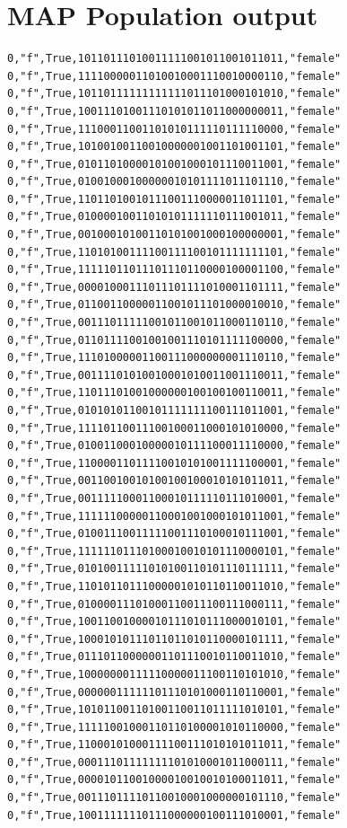 \documentclass[authoryearcitations]{UoYCSproject}
\begin{document}
\section{MAP Population output}
\begin{framed}
\begin{verbatim}
0,"f",True,10110111010011111001011001011011,"female"
0,"f",True,11110000011010010001110010000110,"female"
0,"f",True,10110111111111111011101000101010,"female"
0,"f",True,10011101001110101011011000000011,"female"
0,"f",True,11100011001101010111110111110000,"female"
0,"f",True,10100100110010000001001101001101,"female"
0,"f",True,01011010000101001000101110011001,"female"
0,"f",True,01001000100000010101111011101110,"female"
0,"f",True,11011010010111001110000011011101,"female"
0,"f",True,01000010011010101111110111001011,"female"
0,"f",True,00100010100110101001000100000001,"female"
0,"f",True,11010100111100111100101111111101,"female"
0,"f",True,11111011011101110110000100001100,"female"
0,"f",True,00001000111011101111010001101111,"female"
0,"f",True,01100110000011001011101000010010,"female"
0,"f",True,00111011111001011001011000110110,"female"
0,"f",True,01101111001001001110101111100000,"female"
0,"f",True,11101000001100111000000001110110,"female"
0,"f",True,00111101010010001010011001110011,"female"
0,"f",True,11011101001000000100100100110011,"female"
0,"f",True,01010101100101111111100111011001,"female"
0,"f",True,11110110011100100011000101010000,"female"
0,"f",True,01001100010000010111100011110000,"female"
0,"f",True,11000011011110010101001111100001,"female"
0,"f",True,00110010010100100100010101011011,"female"
0,"f",True,00111110001100010111110111010001,"female"
0,"f",True,11111100000110001001000101011001,"female"
0,"f",True,01001110011111001110100010111001,"female"
0,"f",True,11111101110100010010101110000101,"female"
0,"f",True,01010011111010100110101110111111,"female"
0,"f",True,11010110111000001010110110011010,"female"
0,"f",True,01000011101000110011100111000111,"female"
0,"f",True,10011001000010111010111000010101,"female"
0,"f",True,10001010111011011010110000101111,"female"
0,"f",True,01110110000001101110010110011010,"female"
0,"f",True,10000000111110000011100110101010,"female"
0,"f",True,00000011111101110101000110110001,"female"
0,"f",True,10101100110100110011011111010101,"female"
0,"f",True,11111001000110110100001010110000,"female"
0,"f",True,11000101000111100111010101011011,"female"
0,"f",True,00011101111111101010001011000111,"female"
0,"f",True,00001011001000010010010100011011,"female"
0,"f",True,00111011110110010001000000101110,"female"
0,"f",True,10011111110111000000100111010001,"female"

\end{verbatim}
\end{framed}
\end{document}
